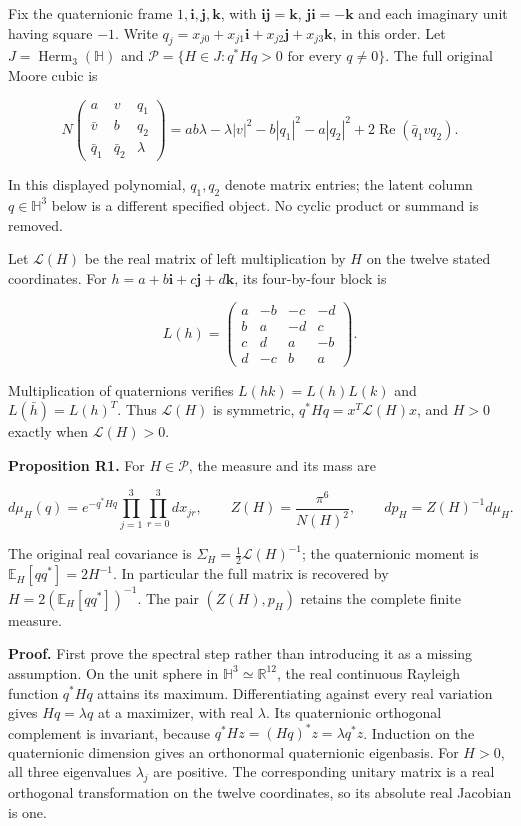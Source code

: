 \documentclass[
  11pt,
]{article}
\begin{document}
Fix the quaternionic frame \(1,\mathbf i,\mathbf j,\mathbf k\), with
\(\mathbf i\mathbf j=\mathbf k\), \(\mathbf j\mathbf i=-\mathbf k\) and
each imaginary unit having square \(-1\). Write
\(q_j=x_{j0}+x_{j1}\mathbf i+x_{j2}\mathbf j+x_{j3}\mathbf k\), in this
order. Let \(J=\operatorname{Herm}_3(\mathbb H)\) and
\(\mathcal P=\{H\in J:q^*Hq>0\text{ for every }q\ne0\}\). The full
original Moore cubic is

\[
N\!\begin{pmatrix}a&v&q_1\\\bar v&b&q_2\\\bar q_1&\bar q_2&\lambda\end{pmatrix}
=ab\lambda-\lambda|v|^2-b|q_1|^2-a|q_2|^2
+2\operatorname{Re}(\bar q_1vq_2).
\]

In this displayed polynomial, \(q_1,q_2\) denote matrix entries; the
latent column \(q\in\mathbb H^3\) below is a different specified object.
No cyclic product or summand is removed.

Let \(\mathscr L(H)\) be the real matrix of left multiplication by \(H\)
on the twelve stated coordinates. For
\(h=a+b\mathbf i+c\mathbf j+d\mathbf k\), its four-by-four block is

\[
L(h)=\begin{pmatrix}
a&-b&-c&-d\\ b&a&-d&c\\ c&d&a&-b\\ d&-c&b&a
\end{pmatrix}.
\]

Multiplication of quaternions verifies \(L(hk)=L(h)L(k)\) and
\(L(\bar h)=L(h)^T\). Thus \(\mathscr L(H)\) is symmetric,
\(q^*Hq=x^T\mathscr L(H)x\), and \(H>0\) exactly when
\(\mathscr L(H)>0\).

\textbf{Proposition R1.} For \(H\in\mathcal P\), the measure and its
mass are

\[
d\mu_H(q)=e^{-q^*Hq}\prod_{j=1}^3\prod_{r=0}^3 dx_{jr},\qquad
Z(H)=\frac{\pi^6}{N(H)^2},\qquad
dp_H=Z(H)^{-1}d\mu_H.
\]

The original real covariance is \(\Sigma_H=\frac12\mathscr L(H)^{-1}\);
the quaternionic moment is \(\mathbb E_H[qq^*]=2H^{-1}\). In particular
the full matrix is recovered by \(H=2(\mathbb E_H[qq^*])^{-1}\). The
pair \((Z(H),p_H)\) retains the complete finite measure.

\textbf{Proof.} First prove the spectral step rather than introducing it
as a missing assumption. On the unit sphere in
\(\mathbb H^3\simeq\mathbb R^{12}\), the real continuous Rayleigh
function \(q^*Hq\) attains its maximum. Differentiating against every
real variation gives \(Hq=\lambda q\) at a maximizer, with real
\(\lambda\). Its quaternionic orthogonal complement is invariant,
because \(q^*Hz=(Hq)^*z=\lambda q^*z\). Induction on the quaternionic
dimension gives an orthonormal quaternionic eigenbasis. For \(H>0\), all
three eigenvalues \(\lambda_j\) are positive. The corresponding unitary
matrix is a real orthogonal transformation on the twelve coordinates, so
its absolute real Jacobian is one.
\end{document}
